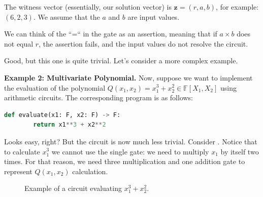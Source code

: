 \documentclass[../lecture-notes-148x210.tex]{subfiles}
\begin{document}
The witness vector (essentially, our solution vector) is $\mathbf{z} = (r, a, b)$, for example: $(6, 2, 3)$. We 
assume that the $a$ and $b$ are input values. 

We can think of the ``=`` in the gate as an assertion, meaning that if $a \times b$ does not equal
$r$, the assertion fails, and the input values do not resolve the circuit.

Good, but this one is quite trivial. Let's consider a more complex example.

\textbf{Example 2: Multivariate Polynomial.} Now, suppose we want to implement the evaluation of the polynomial $Q(x_1,x_2) = x_1^3 + x_2^2 \in \mathbb{F}[X_1,X_2]$ using arithmetic circuits. The corresponding program is as follows:
\begin{lstlisting}[language=Python,numbers=none]
    def evaluate(x1: F, x2: F) -> F:
        return x1**3 + x2**2
\end{lstlisting}

Looks easy, right? But the circuit is now much less trivial. Consider . Notice that to calculate $x_1^3$ we cannot use the single gate: we need to multiply $x_1$ by itself two times. For that reason, we need three multiplication and one addition gate to represent $Q(x_1,x_2)$ calculation.
\begin{figure}[h!]
    \centering
    \caption{Example of a circuit evaluating $x_1^3 + x_2^2$.}
    \label{fig:multivariate-polynomial-circuit}
\end{figure}
\end{document}
